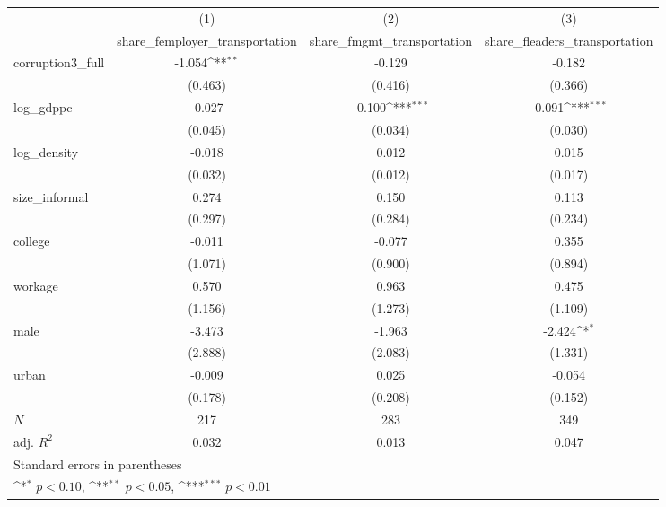 {
\def\sym#1{\ifmmode^{#1}\else\(^{#1}\)\fi}
\begin{tabular}{l*{3}{c}}
\hline\hline
            &\multicolumn{1}{c}{(1)}&\multicolumn{1}{c}{(2)}&\multicolumn{1}{c}{(3)}\\
            &\multicolumn{1}{c}{share\_femployer\_transportation}&\multicolumn{1}{c}{share\_fmgmt\_transportation}&\multicolumn{1}{c}{share\_fleaders\_transportation}\\
\hline
corruption3\_full&      -1.054\sym{**} &      -0.129         &      -0.182         \\
            &     (0.463)         &     (0.416)         &     (0.366)         \\
[1em]
log\_gdppc   &      -0.027         &      -0.100\sym{***}&      -0.091\sym{***}\\
            &     (0.045)         &     (0.034)         &     (0.030)         \\
[1em]
log\_density &      -0.018         &       0.012         &       0.015         \\
            &     (0.032)         &     (0.012)         &     (0.017)         \\
[1em]
size\_informal&       0.274         &       0.150         &       0.113         \\
            &     (0.297)         &     (0.284)         &     (0.234)         \\
[1em]
college     &      -0.011         &      -0.077         &       0.355         \\
            &     (1.071)         &     (0.900)         &     (0.894)         \\
[1em]
workage     &       0.570         &       0.963         &       0.475         \\
            &     (1.156)         &     (1.273)         &     (1.109)         \\
[1em]
male        &      -3.473         &      -1.963         &      -2.424\sym{*}  \\
            &     (2.888)         &     (2.083)         &     (1.331)         \\
[1em]
urban       &      -0.009         &       0.025         &      -0.054         \\
            &     (0.178)         &     (0.208)         &     (0.152)         \\
\hline
\(N\)       &         217         &         283         &         349         \\
adj. \(R^{2}\)&       0.032         &       0.013         &       0.047         \\
\hline\hline
\multicolumn{4}{l}{\footnotesize Standard errors in parentheses}\\
\multicolumn{4}{l}{\footnotesize \sym{*} \(p<0.10\), \sym{**} \(p<0.05\), \sym{***} \(p<0.01\)}\\
\end{tabular}
}
